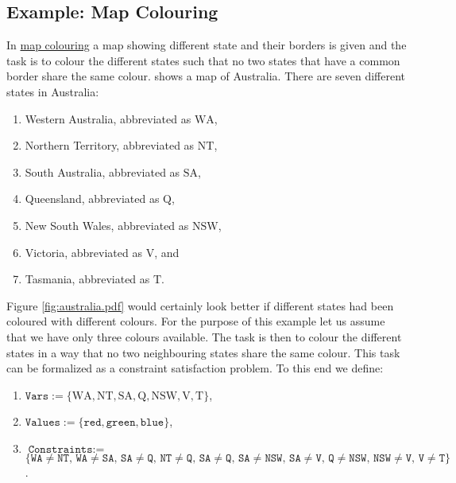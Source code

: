 \subsection{Example: Map Colouring}
In \href{https://en.wikipedia.org/wiki/Four_color_theorem}{map colouring} a map showing different state and their
borders is given and the task is to colour the different states such that no two states that have a common
border share the same colour.   shows a map of Australia.  There are seven different
states in Australia:
\begin{enumerate}
\item Western Australia, abbreviated as $\mathrm{WA}$,
\item Northern Territory, abbreviated as $\mathrm{NT}$,
\item South Australia, abbreviated as $\mathrm{SA}$,
\item Queensland, abbreviated as $\mathrm{Q}$,
\item New South Wales, abbreviated as $\mathrm{NSW}$,
\item Victoria, abbreviated as $\mathrm{V}$, and
\item Tasmania, abbreviated as $\mathrm{T}$.
\end{enumerate}
Figure \ref{fig:australia.pdf} would certainly look better if different states had been coloured with different
colours.  For the purpose of 
this example let us assume that we have only three colours available.  The task is then to colour the different
states in a way that no two neighbouring states share the same colour.  This task can be formalized as a
constraint satisfaction problem.  To this end we define: 
\begin{enumerate}
\item $\texttt{Vars} := \{ \mathrm{WA}, \mathrm{NT}, \mathrm{SA}, \mathrm{Q}, \mathrm{NSW}, \mathrm{V}, \mathrm{T} \}$,
\item $\texttt{Values} := \{ \texttt{red}, \texttt{green}, \texttt{blue} \}$,
\item $\texttt{Constraints} := $ \\[0.2cm]
      \hspace*{0.8cm}
      $\bigl\{ \mathtt{WA} \not= \mathtt{NT},\, \mathtt{WA} \not= \mathtt{SA},\, \mathtt{SA} \not= \mathtt{Q},\, 
                \mathtt{NT} \not= \mathtt{Q},\,
                \mathtt{SA} \not= \mathtt{Q},\, \mathtt{SA} \not= \mathtt{NSW},\, \mathtt{SA} \not= \mathtt{V},\,
                \mathtt{Q} \not= \mathtt{NSW},\, \mathtt{NSW} \not= \mathtt{V},\, \mathtt{V} \not= \mathtt{T}
       \bigr\}$.
\end{enumerate}
